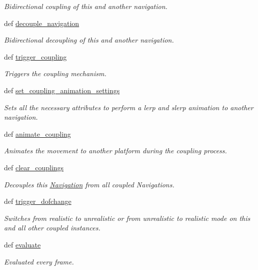 \begin{DoxyCompactItemize}
\begin{DoxyCompactList}\small\item\em \-Bidirectional coupling of this and another navigation. \end{DoxyCompactList}\item 
def \hyperlink{classlib_1_1Navigation_1_1Navigation_a0f91413f294ba555d736ca3cb08b170a}{decouple\-\_\-navigation}
\begin{DoxyCompactList}\small\item\em \-Bidirectional decoupling of this and another navigation. \end{DoxyCompactList}\item 
def \hyperlink{classlib_1_1Navigation_1_1Navigation_a11c019d2607e24d1a7c181c1f6bc4258}{trigger\-\_\-coupling}
\begin{DoxyCompactList}\small\item\em \-Triggers the coupling mechanism. \end{DoxyCompactList}\item 
def \hyperlink{classlib_1_1Navigation_1_1Navigation_ab7cf17ddb952e15c828362180a838cdf}{set\-\_\-coupling\-\_\-animation\-\_\-settings}
\begin{DoxyCompactList}\small\item\em \-Sets all the necessary attributes to perform a lerp and slerp animation to another navigation. \end{DoxyCompactList}\item 
def \hyperlink{classlib_1_1Navigation_1_1Navigation_a875c52ef55ee284954fcd3c7649b3f02}{animate\-\_\-coupling}
\begin{DoxyCompactList}\small\item\em \-Animates the movement to another platform during the coupling process. \end{DoxyCompactList}\item 
def \hyperlink{classlib_1_1Navigation_1_1Navigation_ad08d0d4e9ea8dc994135b564d7c56873}{clear\-\_\-couplings}
\begin{DoxyCompactList}\small\item\em \-Decouples this \hyperlink{classlib_1_1Navigation_1_1Navigation}{\-Navigation} from all coupled \-Navigations. \end{DoxyCompactList}\item 
def \hyperlink{classlib_1_1Navigation_1_1Navigation_a11eb44407e80e971fceda4ab637b755c}{trigger\-\_\-dofchange}
\begin{DoxyCompactList}\small\item\em \-Switches from realistic to unrealistic or from unrealistic to realistic mode on this and all other coupled instances. \end{DoxyCompactList}\item 
def \hyperlink{classlib_1_1Navigation_1_1Navigation_a5eefc6600f0289531b61a488056ab687}{evaluate}
\begin{DoxyCompactList}\small\item\em \-Evaluated every frame. \end{DoxyCompactList}\end{DoxyCompactItemize}
